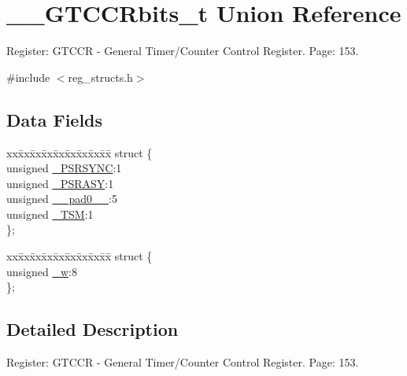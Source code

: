 \hypertarget{union_____g_t_c_c_rbits__t}{\section{\+\_\+\+\_\+\+G\+T\+C\+C\+Rbits\+\_\+t Union Reference}
\label{union_____g_t_c_c_rbits__t}
}


Register\+: G\+T\+C\+C\+R -\/ General Timer/\+Counter Control Register. Page\+: 153.  




{\ttfamily \#include $<$reg\+\_\+structs.\+h$>$}

\subsection*{Data Fields}
\begin{DoxyCompactItemize}
\item 
\begin{tabbing}
xx\=xx\=xx\=xx\=xx\=xx\=xx\=xx\=xx\=\kill
struct \{\\
\>unsigned \hyperlink{union_____g_t_c_c_rbits__t_ae072f33838b8c2fca0b6e8a416407357}{\_PSRSYNC}:1\\
\>unsigned \hyperlink{union_____g_t_c_c_rbits__t_ad6264c8b5fd3980a98b458aaf2e4f195}{\_PSRASY}:1\\
\>unsigned \hyperlink{union_____g_t_c_c_rbits__t_a18c8fc8915465c26a306637d50f8c179}{\_\_pad0\_\_}:5\\
\>unsigned \hyperlink{union_____g_t_c_c_rbits__t_a821ece22d061801898f2240869ba3f0f}{\_TSM}:1\\
\}; \\

\end{tabbing}\item 
\begin{tabbing}
xx\=xx\=xx\=xx\=xx\=xx\=xx\=xx\=xx\=\kill
struct \{\\
\>unsigned \hyperlink{union_____g_t_c_c_rbits__t_a17d767fbb601802682f78371b2a34601}{\_w}:8\\
\}; \\

\end{tabbing}\end{DoxyCompactItemize}


\subsection{Detailed Description}
Register\+: G\+T\+C\+C\+R -\/ General Timer/\+Counter Control Register. Page\+: 153. 

